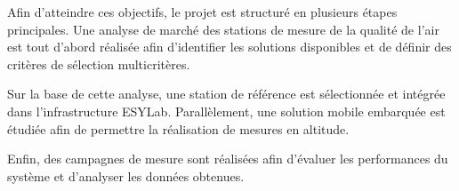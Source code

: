 Afin d'atteindre ces objectifs, le projet est structuré en plusieurs étapes principales. Une analyse de marché des stations de mesure de la qualité de l'air est tout d'abord réalisée afin d'identifier les solutions disponibles et de définir des critères de sélection multicritères.

Sur la base de cette analyse, une station de référence est sélectionnée et intégrée dans l'infrastructure ESYLab. Parallèlement, une solution mobile embarquée est étudiée afin de permettre la réalisation de mesures en altitude.

Enfin, des campagnes de mesure sont réalisées afin d'évaluer les performances du système et d'analyser les données obtenues.
